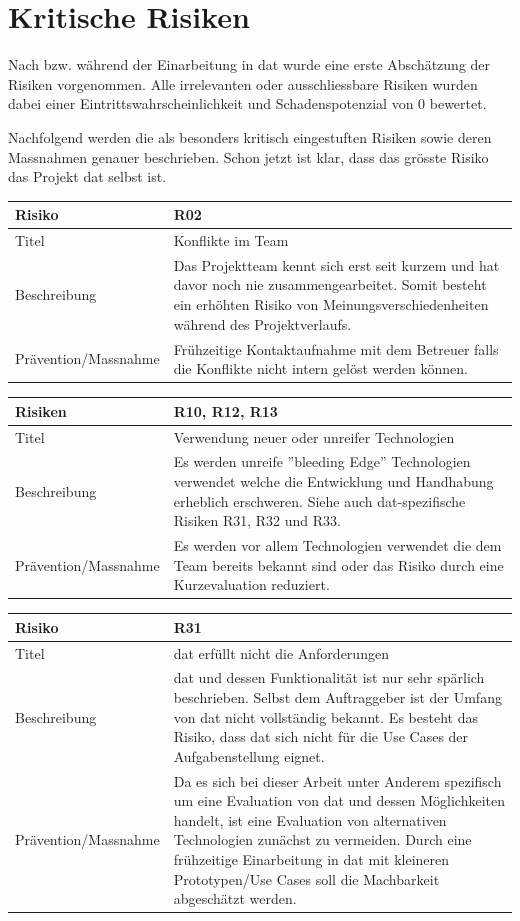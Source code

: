 \section{Kritische Risiken}
Nach bzw. während der Einarbeitung in \gls{dat} wurde eine erste Abschätzung der Risiken vorgenommen. Alle irrelevanten oder ausschliessbare Risiken wurden dabei einer Eintrittswahrscheinlichkeit und Schadenspotenzial von 0 bewertet.

Nachfolgend werden die als besonders kritisch eingestuften Risiken sowie deren Massnahmen genauer beschrieben. Schon jetzt ist klar, dass das grösste Risiko das Projekt \gls{dat} selbst ist.


\begin{tabularx}{\linewidth}{lX}
	\toprule
	Risiko & R02\\
	\midrule
	Titel & Konflikte im Team\\
	Beschreibung & Das Projektteam kennt sich erst seit kurzem und hat davor noch nie zusammengearbeitet. Somit besteht ein erhöhten Risiko von Meinungsverschiedenheiten während des Projektverlaufs.\\
	Prävention/Massnahme & Frühzeitige Kontaktaufnahme mit dem Betreuer falls die Konflikte nicht intern gelöst werden können.\\
	\bottomrule
\end{tabularx}

\begin{tabularx}{\linewidth}{lX}
	\toprule
	Risiken & R10, R12, R13\\
	\midrule
	Titel & Verwendung neuer oder unreifer Technologien\\
	Beschreibung & Es werden unreife ''bleeding Edge'' Technologien verwendet welche die Entwicklung und Handhabung erheblich erschweren. Siehe auch \gls{dat}-spezifische Risiken R31, R32 und R33.\\
	Prävention/Massnahme & Es werden vor allem Technologien verwendet die dem Team bereits bekannt sind oder das Risiko durch eine Kurzevaluation reduziert.\\
	\bottomrule
\end{tabularx}

\begin{tabularx}{\linewidth}{lX}
	\toprule
	Risiko & R31\\
	\midrule
	Titel & \gls{dat} erfüllt nicht die Anforderungen\\
	Beschreibung & \gls{dat} und dessen Funktionalität ist nur sehr spärlich beschrieben. Selbst dem Auftraggeber ist der Umfang von \gls{dat} nicht vollständig bekannt. Es besteht das Risiko, dass \gls{dat} sich nicht für die Use Cases der Aufgabenstellung eignet.\\
	Prävention/Massnahme & Da es sich bei dieser Arbeit unter Anderem spezifisch um eine Evaluation von \gls{dat} und dessen Möglichkeiten handelt, ist eine Evaluation von alternativen Technologien zunächst zu vermeiden. Durch eine frühzeitige Einarbeitung in \gls{dat} mit kleineren Prototypen/Use Cases soll die Machbarkeit abgeschätzt werden.\\
	\bottomrule
\end{tabularx}

